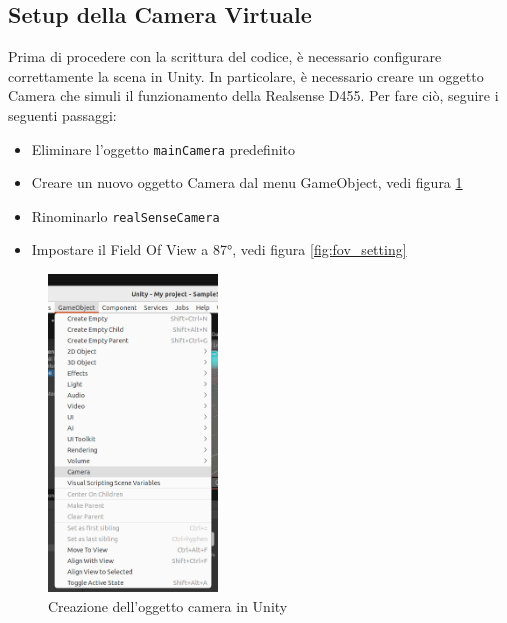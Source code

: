 \documentclass[11pt]{report}
\begin{document}
\subsection{Setup della Camera Virtuale}
Prima di procedere con la scrittura del codice, è necessario configurare correttamente la scena in Unity. In particolare, è necessario creare un oggetto Camera che simuli il funzionamento della Realsense D455. Per fare ciò, seguire i seguenti passaggi:

\begin{itemize}
\item Eliminare l'oggetto \texttt{mainCamera} predefinito
\item Creare un nuovo oggetto Camera dal menu GameObject, vedi figura \ref{fig:create_camera}
\item Rinominarlo \texttt{realSenseCamera}
\item Impostare il Field Of View a 87°, vedi figura \ref{fig:fov_setting}
\end{itemize}

\begin{figure}[H]
    \centering
    \includegraphics[width=0.4\textwidth]{images/Immagine1.png}
    \caption{Creazione dell'oggetto camera in Unity}
    \label{fig:create_camera}
\end{figure}
\end{document}
